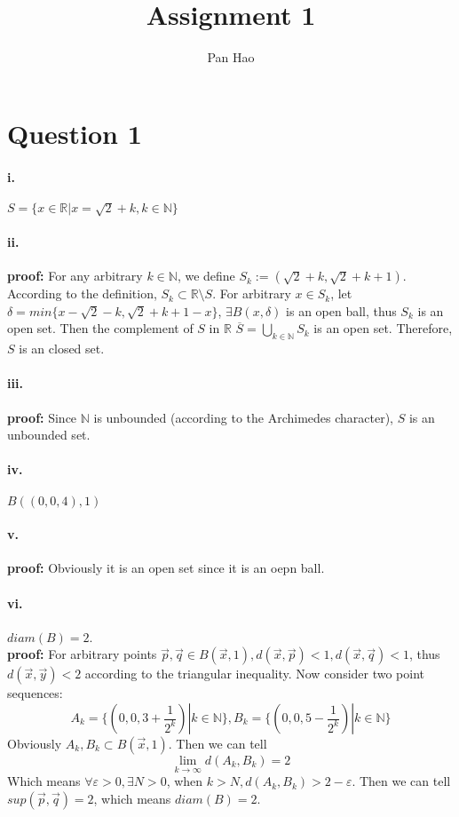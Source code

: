 \documentclass[11pt, a4paper]{article}
\begin{document}
\title{Assignment 1}
\author{Pan Hao}
\date{}
\maketitle
\section*{Question 1} 
\paragraph{i.}
$S = \{x \in \mathbb{R} | x = \sqrt {2} + k, k \in \mathbb{N} \}$ 
\paragraph{ii.}
\textbf{proof:} For any arbitrary $k\in \mathbb{N}$, we define $S_k := (\sqrt{2} + k, \sqrt{2} + k + 1)$. \\ 
According to the definition, $S_k \subset \mathbb{R} \setminus S$. For arbitrary $x \in S_k$, let $\delta = min\{x- \sqrt{2} - k, \sqrt{2} + k + 1 - x\}$, $\exists B(x, \delta)$ is an open ball, thus $S_k$ is an open set.
Then the complement of $S$ in $\mathbb{R}$ $\overline{S} = \bigcup_{k \in \mathbb{N}} S_k$ is an open set. Therefore, $S$ is an closed set.
\paragraph{iii.}
\textbf{proof:} Since $\mathbb{N}$ is unbounded (according to the Archimedes character), $S$ is an unbounded set.
\paragraph{iv.}
$B((0, 0, 4), 1)$
\paragraph{v.}
\textbf{proof:} Obviously it is an open set since it is an oepn ball.
\paragraph{vi.}
$diam(B) = 2$.\\
\textbf{proof:} For arbitrary points $\vec{p}, \vec{q} \in B(\vec{x}, 1), d(\vec{x}, \vec{p}) < 1, d(\vec{x}, \vec{q}) < 1$, thus $d(\vec{x}, \vec{y}) < 2$ according to the triangular inequality.
Now consider two point sequences:
$$A_k = \{ (0, 0, 3 + \frac{1}{2 ^ k}) | k \in \mathbb{N} \}, B_k = \{ (0, 0, 5 - \frac{1}{2 ^ k}) | k \in \mathbb{N} \}$$
Obviously $A_k, B_k \subset B(\vec{x}, 1)$.
Then we can tell
$$\lim_{k \to \infty} d(A_k, B_k) = 2$$
Which means $\forall \varepsilon > 0, \exists N > 0$, when $k > N, d(A_k, B_k) > 2 - \varepsilon$. Then we can tell $sup(\vec{p}, \vec{q}) = 2$, which means $diam(B) = 2$.
\end{document}
